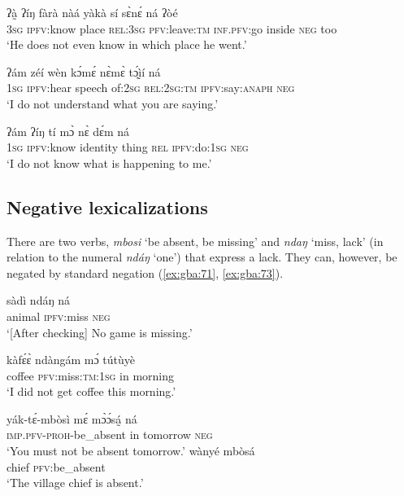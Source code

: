 \documentclass[output=paper,colorlinks=true, citecolor=brown]{langscibook}
\begin{document}
\ea\label{ex:gba:62}
    \gll ʔà̰   ʔíŋ fàrà nàá yàkà sí sɛ̀nɛ́ ná ʔòé \\ 
         3\textsc{sg} \textsc{ipfv}:know place \textsc{rel}:3\textsc{sg} \textsc{pfv}:leave:\textsc{tm} \textsc{inf.pfv}:go inside \textsc{neg} too \\
    \glt ‘He does not even know in which place he went.’
\z 

\ea\label{ex:gba:63}
    \gll  ʔám zéí wèn kɔ́mɛ́ nɛ̀mɛ̀ tɔ̰́ìí ná \\ 
         1\textsc{sg} \textsc{ipfv}:hear speech of:2\textsc{sg} \textsc{rel}:2\textsc{sg:tm} \textsc{ipfv}:say:\textsc{anaph} \textsc{neg} \\
    \glt ‘I do not understand what you are saying.’
\z 

\ea\label{ex:gba:64}
    \gll ʔám ʔíŋ tí mɔ̀ nɛ̀ dɛ́m ná \\ 
          1\textsc{sg} \textsc{ipfv}:know identity thing \textsc{rel} \textsc{ipfv}:do:1\textsc{sg} \textsc{neg} \\
    \glt ‘I do not know what is happening to me.’
\z 
 
\subsection{Negative lexicalizations}\label{sec:gba:2.5}

There are two verbs, \textit{mbosi} ‘be absent, be missing’  and \textit{ndaŋ} ‘miss, lack’  (in relation to the numeral \textit{ndáŋ} ‘one’) that express a lack. They can, however, be negated by standard negation (\ref{ex:gba:71}, \ref{ex:gba:73}). 

\ea\label{ex:gba:71}
    \gll sàdì ndáŋ ná  \\ 
          animal \textsc{ipfv}:miss \textsc{neg}  \\
    \glt ‘[After checking] No game is missing.’
\z 

\ea\label{ex:gba:72}
    \gll kàfɛ́ɛ̀ ndàngám mɔ́ tútùyè \\ 
         coffee \textsc{pfv}:miss:\textsc{tm:1sg} in morning \\
    \glt ‘I did not get coffee this morning.’
\z 

\ea\label{ex:gba:73}
    \gll yák-tɛ́-mbòsì mɛ́ mɔ̀ɔ́sá̰  ná  \\ 
         \textsc{imp.pfv-proh}-be\_absent in tomorrow \textsc{neg}  \\
    \glt ‘You must not be absent tomorrow.’
\z 
\ea\label{ex:gba:74}
    \gll wànyé mbòsá \\ 
         chief \textsc{pfv}:be\_absent \\
    \glt ‘The village chief is absent.’
\z 
\end{document}
